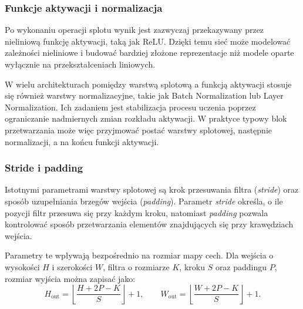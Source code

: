\subsubsection*{Funkcje aktywacji i normalizacja}

Po wykonaniu operacji splotu wynik jest zazwyczaj przekazywany przez nieliniową funkcję aktywacji, taką jak ReLU. Dzięki temu sieć może modelować zależności nieliniowe i budować bardziej złożone reprezentacje niż modele oparte wyłącznie na przekształceniach liniowych.

W wielu architekturach pomiędzy warstwą splotową a funkcją aktywacji stosuje się również warstwy normalizacyjne, takie jak Batch Normalization lub Layer Normalization. Ich zadaniem jest stabilizacja procesu uczenia poprzez ograniczanie nadmiernych zmian rozkładu aktywacji. W praktyce typowy blok przetwarzania może więc przyjmować postać warstwy splotowej, następnie normalizacji, a na końcu funkcji aktywacji.

\subsubsection*{Stride i padding}

Istotnymi parametrami warstwy splotowej są krok przesuwania filtra (\textit{stride}) oraz sposób uzupełniania brzegów wejścia (\textit{padding}). Parametr \textit{stride} określa, o ile pozycji filtr przesuwa się przy każdym kroku, natomiast \textit{padding} pozwala kontrolować sposób przetwarzania elementów znajdujących się przy krawędziach wejścia.

Parametry te wpływają bezpośrednio na rozmiar mapy cech. Dla wejścia o wysokości $H$ i szerokości $W$, filtra o rozmiarze $K$, kroku $S$ oraz paddingu $P$, rozmiar wyjścia można zapisać jako:
\[
H_{\mathrm{out}}=\left\lfloor \frac{H+2P-K}{S} \right\rfloor + 1,
\qquad
W_{\mathrm{out}}=\left\lfloor \frac{W+2P-K}{S} \right\rfloor + 1.
\]

